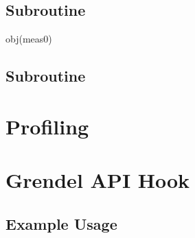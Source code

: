 \subsection{ Subroutine}

\begin{algorithmic}
  obj(meas0)
  \EndFor
  \EndFor
\end{algorithmic}

\subsection{ Subroutine}

\section{Profiling}\label{fanout:calib}
\section{Grendel API Hook}
\subsection{Example Usage}